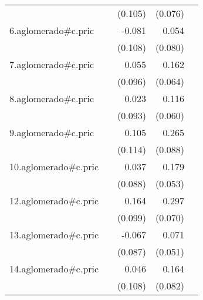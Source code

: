 {\begin{longtable}{l*{4}{D{.}{.}{-1}}}
            &                     &     (0.105)         &     (0.076)         &                     \\
\addlinespace
6.aglomerado#c.pric&                     &      -0.081         &       0.054         &                     \\
            &                     &     (0.108)         &     (0.080)         &                     \\
\addlinespace
7.aglomerado#c.pric&                     &       0.055         &       0.162\sym{*}  &                     \\
            &                     &     (0.096)         &     (0.064)         &                     \\
\addlinespace
8.aglomerado#c.pric&                     &       0.023         &       0.116         &                     \\
            &                     &     (0.093)         &     (0.060)         &                     \\
\addlinespace
9.aglomerado#c.pric&                     &       0.105         &       0.265\sym{**} &                     \\
            &                     &     (0.114)         &     (0.088)         &                     \\
\addlinespace
10.aglomerado#c.pric&                     &       0.037         &       0.179\sym{***}&                     \\
            &                     &     (0.088)         &     (0.053)         &                     \\
\addlinespace
12.aglomerado#c.pric&                     &       0.164         &       0.297\sym{***}&                     \\
            &                     &     (0.099)         &     (0.070)         &                     \\
\addlinespace
13.aglomerado#c.pric&                     &      -0.067         &       0.071         &                     \\
            &                     &     (0.087)         &     (0.051)         &                     \\
\addlinespace
14.aglomerado#c.pric&                     &       0.046         &       0.164\sym{*}  &                     \\
            &                     &     (0.108)         &     (0.082)         &                     \\

\end{longtable}}
